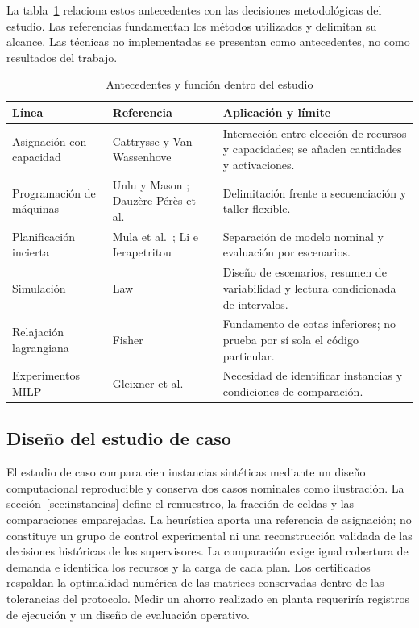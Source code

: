 La tabla~\ref{tab:literatura} relaciona estos antecedentes con las decisiones metodológicas del estudio. Las referencias fundamentan los métodos utilizados y delimitan su alcance. Las técnicas no implementadas se presentan como antecedentes, no como resultados del trabajo.
\begin{table}[H]\centering\small
\caption{Antecedentes y función dentro del estudio}\label{tab:literatura}
\begin{tabular}{p{35mm}p{52mm}p{58mm}}\toprule
Línea & Referencia & Aplicación y límite\\\midrule
Asignación con capacidad & Cattrysse y Van Wassenhove \cite{cattrysse} & Interacción entre elección de recursos y capacidades; se añaden cantidades y activaciones.\\
Programación de máquinas & Unlu y Mason \cite{unlu}; Dauzère-Pérès et al.\ \cite{dauzere} & Delimitación frente a secuenciación y taller flexible.\\
Planificación incierta & Mula et al.\ \cite{mula}; Li e Ierapetritou \cite{li} & Separación de modelo nominal y evaluación por escenarios.\\
Simulación & Law \cite{law} & Diseño de escenarios, resumen de variabilidad y lectura condicionada de intervalos.\\
Relajación lagrangiana & Fisher \cite{fisher} & Fundamento de cotas inferiores; no prueba por sí sola el código particular.\\
Experimentos MILP & Gleixner et al.\ \cite{miplib} & Necesidad de identificar instancias y condiciones de comparación.\\\bottomrule
\end{tabular}
\end{table}

\subsection{Diseño del estudio de caso}
El estudio de caso compara cien instancias sintéticas mediante un diseño computacional reproducible y conserva dos casos nominales como ilustración. La sección~\ref{sec:instancias} define el remuestreo, la fracción de celdas y las comparaciones emparejadas. La heurística aporta una referencia de asignación; no constituye un grupo de control experimental ni una reconstrucción validada de las decisiones históricas de los supervisores. La comparación exige igual cobertura de demanda e identifica los recursos y la carga de cada plan. Los certificados respaldan la optimalidad numérica de las matrices conservadas dentro de las tolerancias del protocolo. Medir un ahorro realizado en planta requeriría registros de ejecución y un diseño de evaluación operativo.